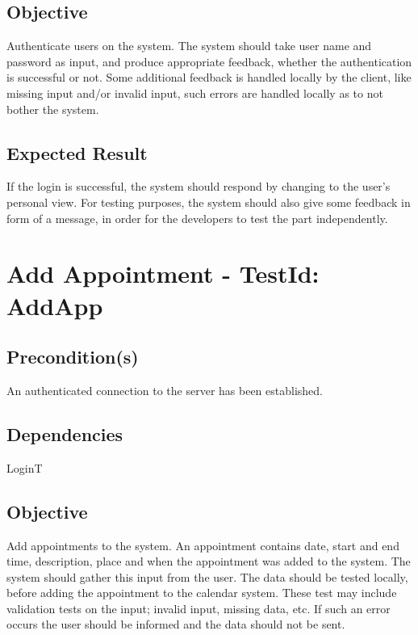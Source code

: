 \documentclass{article}
\begin{document}
\subsection{Objective}

Authenticate users on the system. The system should take user name and
password as input, and produce appropriate feedback, whether the
authentication is successful or not. Some additional feedback is handled
locally by the client, like missing input and/or invalid input, such errors
are handled locally as to not bother the system.

\subsection{Expected Result}

If the login is successful, the system should respond by changing to the
user's personal view. For testing purposes, the system should also give some
feedback in form of a message, in order for the developers to test the part
independently. \newpage

\section{Add Appointment - TestId: AddApp}

\subsection{Precondition(s)}

An authenticated connection to the server has been established.

\subsection{Dependencies}

LoginT

\subsection{Objective}

Add appointments to the system. An appointment contains date, start and end
time, description, place and when the appointment was added to the system.
The system should gather this input from the user. The data should be tested
locally, before adding the appointment to the calendar system. These test
may include validation tests on the input; invalid input, missing data, etc.
If such an error occurs the user should be informed and the data should not
be sent.
\end{document}
